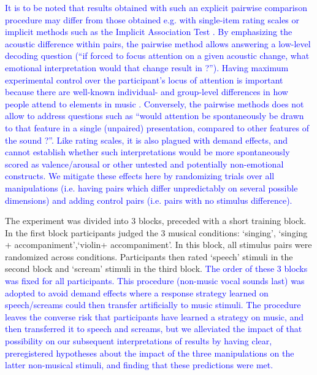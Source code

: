 \documentclass[openacc]{rsprocb_new}%
\begin{document}
\textcolor{blue}{It is to be noted that results obtained with such an explicit pairwise comparison procedure may differ from those obtained e.g. with single-item rating scales \cite{BEL10} or implicit methods such as the Implicit Association Test \cite{ANIK19}. By emphasizing the acoustic difference within pairs, the pairwise method allows answering a low-level decoding question (``if forced to focus attention on a given acoustic change, what emotional interpretation would that change result in ?''). Having maximum experimental control over the participant's locus of attention is important because there are well-known individual- and group-level differences in how people attend to elements in music \cite{GER95}. Conversely, the pairwise methods does not allow to address questions such as ``would attention be spontaneously be drawn to that feature in a single (unpaired) presentation, compared to other features of the sound ?''. Like rating scales, it is also plagued with demand effects, and cannot establish whether such interpretations would be more spontaneously scored as valence/arousal or other untested and potentially non-emotional constructs. We mitigate these effects here by randomizing trials over all manipulations (i.e. having pairs which differ unpredictably on several possible dimensions) and adding control pairs (i.e. pairs with no stimulus difference).}

The experiment was divided into 3 blocks, preceded with a short training block. In the first block participants judged the 3 musical conditions: ‘singing’, ‘singing + accompaniment’,‘violin+ accompaniment’. In this block, all stimulus pairs were randomized across conditions. Participants then rated ‘speech’ stimuli in the second block and ‘scream’ stimuli in the third block. \textcolor{blue}{The order of these 3 blocks was fixed for all participants. This procedure (non-music vocal sounds last) was adopted to avoid demand effects where a response strategy learned on speech/screams could then transfer artificially to music stimuli. The procedure leaves the converse risk that participants have learned a strategy on music, and then transferred it to speech and screams, but we alleviated the impact of that possibility on our subsequent interpretations of results by having clear, preregistered hypotheses about the impact of the three manipulations on the latter non-musical stimuli, and finding that these predictions were met.} 


\end{document}
